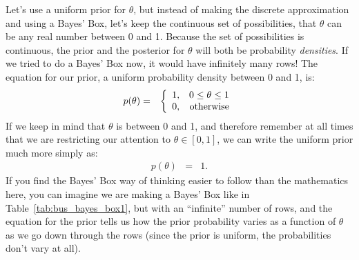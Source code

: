 Let's use a uniform prior for $\theta$, but instead of making the discrete
approximation and using a Bayes' Box, let's keep the continuous set of possibilities,
that $\theta$ can be any real number between 0 and 1. Because the set of
possibilities is continuous, the prior and the posterior for $\theta$ will both
be probability {\it densities}. If we tried to do a Bayes' Box now, it would
have infinitely many rows!
The equation for our prior, a uniform probability density between 0 and 1, is:
\begin{eqnarray}
p(\theta) &=& \left\{
\begin{array}{lr}
1, & 0 \leq \theta \leq 1\\
0, & \textnormal{otherwise}
\end{array}
\right.\label{eq:uniform}
\end{eqnarray}
If we keep in mind that $\theta$ is between 0 and 1, and therefore remember at
all times that we are restricting our attention to $\theta \in [0, 1]$, we can
write the uniform prior much more simply as:
\begin{eqnarray}
p(\theta) &=& 1.
\end{eqnarray}
If you find the Bayes' Box way of thinking easier to follow than the mathematics
here, you can imagine we are making a Bayes' Box like in
Table~\ref{tab:bus_bayes_box1}, but with an ``infinite'' number of rows, and
the equation for the prior tells us how the prior probability varies as a function
of $\theta$ as we go down through the rows (since the prior is uniform, the
probabilities don't vary at all).

